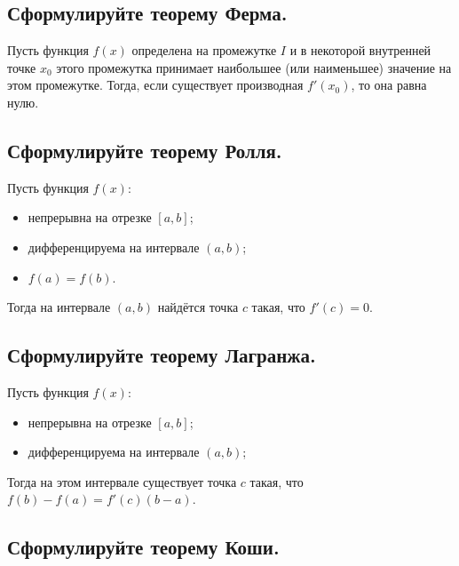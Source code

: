 
\subsection{Сформулируйте теорему Ферма.}

Пусть функция $f(x)$ определена на промежутке $I$ и в некоторой внутренней точке $x_0$ этого промежутка принимает наибольшее (или наименьшее) значение на этом промежутке. Тогда, если существует производная $f'(x_0)$, то она равна нулю.


\subsection{Сформулируйте теорему Ролля.}

Пусть функция $f(x)$:
\begin{itemize}
    \item непрерывна на отрезке $[a,b]$;
    \item дифференцируема на интервале $(a,b)$;
    \item $f(a) = f(b)$. 
\end{itemize}

Тогда на интервале $(a,b)$ найдётся точка $c$ такая, что $f'(c) = 0$.


\subsection{Сформулируйте теорему Лагранжа.}

Пусть функция $f(x)$:
\begin{itemize}
    \item непрерывна на отрезке $[a,b]$;
    \item дифференцируема на интервале $(a,b)$;
\end{itemize} 

Тогда на этом интервале существует точка $c$ такая, что $f(b) − f(a) =f'(c)(b − a)$.


\subsection{Сформулируйте теорему Коши.}

